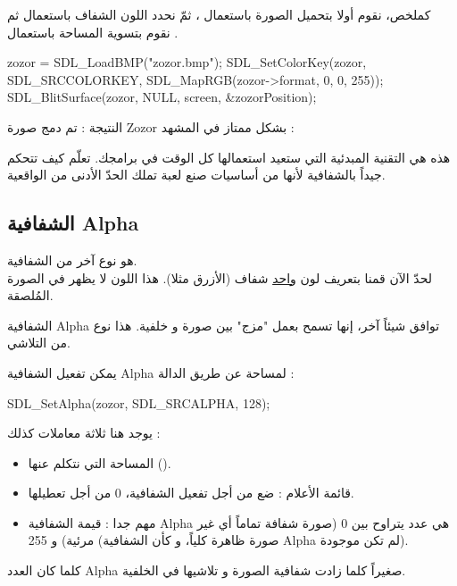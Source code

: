 كملخص، نقوم أولا بتحميل الصورة باستعمال
،
ثمّ نحدد اللون الشفاف باستعمال
ثم نقوم بتسوية المساحة باستعمال
.

\begin{Csource}
zozor = SDL_LoadBMP("zozor.bmp");
SDL_SetColorKey(zozor, SDL_SRCCOLORKEY, SDL_MapRGB(zozor->format, 0, 0, 255));
SDL_BlitSurface(zozor, NULL, screen, &zozorPosition);
\end{Csource}

النتيجة : تم دمج صورة
\textenglish{Zozor}
بشكل ممتاز في المشهد :


هذه هي التقنية المبدئية التي ستعيد استعمالها كل الوقت في برامجك. تعلّم كيف تتحكم جيداً بالشفافية لأنها من أساسيات صنع لعبة تملك الحدّ الأدنى من الواقعية.

\subsection{الشفافية \textenglish{Alpha}}

هو نوع آخر من الشفافية.\\
لحدّ الآن قمنا بتعريف لون 
\underline{واحد}
شفاف (الأزرق مثلا). هذا اللون لا يظهر في الصورة المُلصقة. 

الشفافية 
\textenglish{Alpha}
توافق شيئاً آخر، إنها تسمح بعمل "مزج" بين صورة و خلفية. هذا نوع من التلاشي.

يمكن تفعيل الشفافية
\textenglish{Alpha}
لمساحة عن طريق الدالة
 :

\begin{Csource}
SDL_SetAlpha(zozor, SDL_SRCALPHA, 128);
\end{Csource}

يوجد هنا ثلاثة معاملات كذلك :

\begin{itemize}
	\item المساحة التي نتكلم عنها ().
	\item قائمة الأعلام : ضع
من أجل تفعيل الشفافية، 0 من أجل تعطيلها.
	\item مهم جدا : قيمة الشفافية 
\textenglish{Alpha}
هي عدد يتراوح بين 0 (صورة شفافة تماماً أي غير مرئية) و 255 (صورة ظاهرة كلياً، و كأن الشفافية
\textenglish{Alpha}
لم تكن موجودة).
\end{itemize}

كلما كان العدد
\textenglish{Alpha}
صغيراً كلما زادت شفافية الصورة و تلاشيها في الخلفية.

